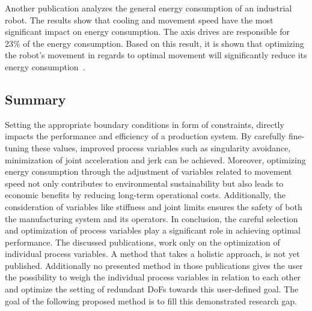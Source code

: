 Another publication analyzes the general energy consumption of an industrial robot. The results show that cooling and movement speed have the most significant impact on energy consumption. The axis drives are responsible for 23\% of the energy consumption. Based on this result, it is shown that optimizing the robot's movement in regards to optimal movement will significantly reduce its energy consumption~\cite{Uhlmann.2016}. 




\subsection{Summary}
Setting the appropriate boundary conditions in form of constraints, directly impacts the performance and efficiency of a production system. By carefully fine-tuning these values, improved process variables such as singularity avoidance, minimization of joint acceleration and jerk can be achieved. Moreover, optimizing energy consumption through the adjustment of variables related to movement speed not only contributes to environmental sustainability but also leads to economic benefits by reducing long-term operational costs. Additionally, the consideration of variables like stiffness and joint limits ensures the safety of both the manufacturing system and its operators.\newline %
In conclusion, the careful selection and optimization of process variables play a significant role in achieving optimal performance. The discussed publications, work only on the optimization of individual process variables. A method that takes a holistic approach, is not yet published. Additionally no presented method in those publications gives the user the possibility to weigh the individual process variables in relation to each other and optimize the setting of redundant \acrshort{DoF}s towards this user-defined goal. The goal of the following proposed method is to fill this demonstrated research gap.